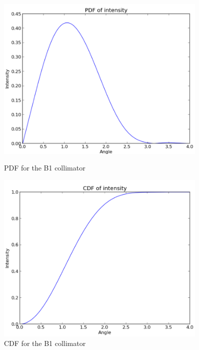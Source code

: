 \begin{figure}
    \centering
    \label{fig:B1_PDF_CDF_coll}
    \begin{minipage}{0.45\textwidth}
        \centering
        \includegraphics[width=0.9\textwidth]{Figures/B1_coll_pdf.png} %
        \caption{PDF for the B1 collimator}
    \end{minipage}\hfill
    \begin{minipage}{0.45\textwidth}
        \centering
        \includegraphics[width=0.9\textwidth]{Figures/B1_coll_cdf.png} %
        \caption{CDF for the B1 collimator }
    \end{minipage}
\end{figure}

